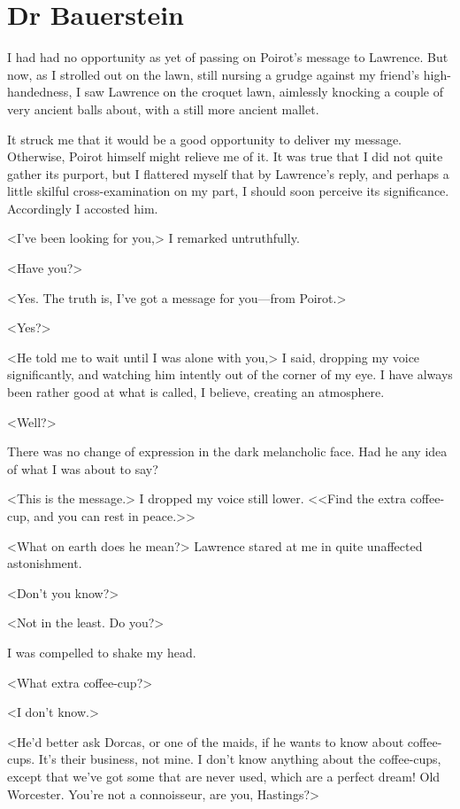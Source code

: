 \chapter{Dr Bauerstein} 
	
\lettrine{I}{} had had no opportunity as yet of passing on Poirot's message to Lawrence. But now, as I strolled out on the lawn, still nursing a grudge against my friend's high-handedness, I saw Lawrence on the croquet lawn, aimlessly knocking a couple of very ancient balls about, with a still more ancient mallet. 

 It struck me that it would be a good opportunity to deliver my message. Otherwise, Poirot himself might relieve me of it. It was true that I did not quite gather its purport, but I flattered myself that by Lawrence's reply, and perhaps a little skilful cross-examination on my part, I should soon perceive its significance. Accordingly I accosted him. 

 <I've been looking for you,> I remarked untruthfully. 

 <Have you?> 

 <Yes. The truth is, I've got a message for you—from Poirot.> 

 <Yes?> 

 <He told me to wait until I was alone with you,> I said, dropping my voice significantly, and watching him intently out of the corner of my eye. I have always been rather good at what is called, I believe, creating an atmosphere. 

 <Well?> 

 There was no change of expression in the dark melancholic face. Had he any idea of what I was about to say? 

 <This is the message.> I dropped my voice still lower. <<Find the extra coffee-cup, and you can rest in peace.>> 

 <What on earth does he mean?> Lawrence stared at me in quite unaffected astonishment. 

 <Don't you know?> 

 <Not in the least. Do you?> 

 I was compelled to shake my head. 

 <What extra coffee-cup?> 

 <I don't know.> 

 <He'd better ask Dorcas, or one of the maids, if he wants to know about coffee-cups. It's their business, not mine. I don't know anything about the coffee-cups, except that we've got some that are never used, which are a perfect dream! Old Worcester. You're not a connoisseur, are you, Hastings?> 

